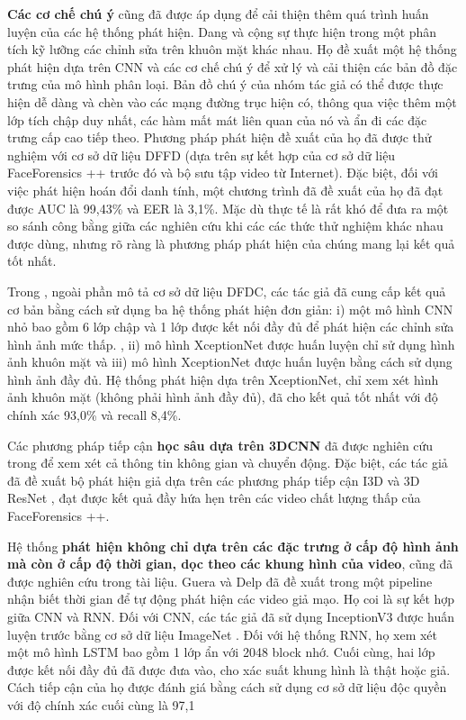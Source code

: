 \documentclass{article}
\begin{document}
\textbf{Các cơ chế chú ý} cũng đã được áp dụng để cải thiện thêm quá trình huấn luyện của các hệ thống phát hiện. Dang và cộng sự thực hiện trong  một phân tích kỹ lưỡng các chỉnh sửa trên khuôn mặt khác nhau. Họ đề xuất một hệ thống phát hiện dựa trên CNN và các cơ chế chú ý để xử lý và cải thiện các bản đồ đặc trưng của mô hình phân loại. Bản đồ chú ý của nhóm tác giả có thể được thực hiện dễ dàng và chèn vào các mạng đường trục hiện có, thông qua việc thêm một lớp tích chập duy nhất, các hàm mất mát liên quan của nó và ẩn đi các đặc trưng cấp cao tiếp theo. Phương pháp phát hiện đề xuất của họ đã được thử nghiệm với cơ sở dữ liệu DFFD (dựa trên sự kết hợp của cơ sở dữ liệu FaceForensics ++ trước đó và bộ sưu tập video từ Internet). Đặc biệt, đối với việc phát hiện hoán đổi danh tính, một chương trình đã đề xuất của họ đã đạt được AUC là 99,43\% và EER là 3,1\%. Mặc dù thực tế là rất khó để đưa ra một so sánh công bằng giữa các nghiên cứu khi các các thức thử nghiệm khác nhau được dùng, nhưng rõ ràng là phương pháp phát hiện của chúng mang lại kết quả tốt nhất.

Trong , ngoài phần mô tả cơ sở dữ liệu DFDC, các tác giả đã cung cấp kết quả cơ bản bằng cách sử dụng ba hệ thống phát hiện đơn giản: i) một mô hình CNN nhỏ bao gồm 6 lớp chập và 1 lớp được kết nối đầy đủ để phát hiện các chỉnh sửa hình ảnh mức thấp. , ii) mô hình XceptionNet được huấn luyện chỉ sử dụng hình ảnh khuôn mặt và iii) mô hình XceptionNet được huấn luyện bằng cách sử dụng hình ảnh đầy đủ. Hệ thống phát hiện dựa trên XceptionNet, chỉ xem xét hình ảnh khuôn mặt (không phải hình ảnh đầy đủ), đã cho kết quả tốt nhất với độ chính xác 93,0\% và recall 8,4\%.

Các phương pháp tiếp cận \textbf{học sâu dựa trên 3DCNN} đã được nghiên cứu trong  để xem xét cả thông tin không gian và chuyển động. Đặc biệt, các tác giả đã đề xuất bộ phát hiện giả dựa trên các phương pháp tiếp cận I3D  và 3D ResNet , đạt được kết quả đầy hứa hẹn trên các video chất lượng thấp của FaceForensics ++.

Hệ thống \textbf{phát hiện không chỉ dựa trên các đặc trưng ở cấp độ hình ảnh mà còn ở cấp độ thời gian, dọc theo các khung hình của video}, cũng đã được nghiên cứu trong tài liệu. Guera và Delp đã đề xuất trong  một pipeline nhận biết thời gian để tự động phát hiện các video giả mạo. Họ coi là sự kết hợp giữa CNN và RNN. Đối với CNN, các tác giả đã sử dụng InceptionV3  được huấn luyện trước bằng cơ sở dữ liệu ImageNet . Đối với hệ thống RNN, họ xem xét một mô hình LSTM bao gồm 1 lớp ẩn với 2048 block nhớ. Cuối cùng, hai lớp được kết nối đầy đủ đã được đưa vào, cho xác suất khung hình là thật hoặc giả. Cách tiếp cận của họ được đánh giá bằng cách sử dụng cơ sở dữ liệu độc quyền với độ chính xác cuối cùng là 97,1%
\end{document}
